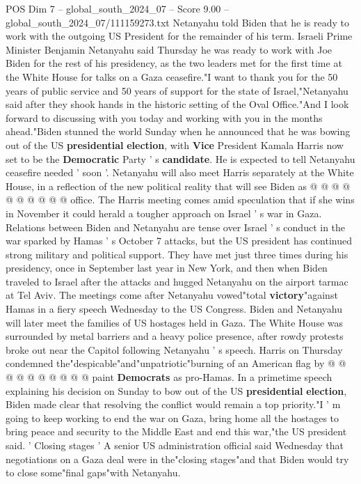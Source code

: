 \begin{textsample}{POS Dim 7 – global\_south\_2024\_07 – Score 9.00 – global\_south\_2024\_07/111159273.txt}  \label{ex:f7_pos_106}
Netanyahu told Biden that he is ready to work with the outgoing US President for the remainder of his term.
Israeli Prime Minister Benjamin Netanyahu said Thursday he was ready to work with Joe Biden for the rest of his presidency, as the two leaders met for the first time at the White House for talks on a Gaza ceasefire."I want to thank you for the 50 years of public service and 50 years of support for the state of Israel,"Netanyahu said after they shook hands in the historic setting of the Oval Office."And I look forward to discussing with you today and working with you in the months ahead."Biden stunned the world Sunday when he announced that he was bowing out of the US \textbf{presidential} \textbf{election}, with \textbf{Vice} President Kamala Harris now set to be the \textbf{Democratic} Party ' s \textbf{candidate}.
He is expected to tell Netanyahu ceasefire needed ' soon '.
Netanyahu will also meet Harris separately at the White House, in a reflection of the new political reality that will see Biden as @ @ @ @ @ @ @ @ @ @ office.
The Harris meeting comes amid speculation that if she wins in November it could herald a tougher approach on Israel ' s war in Gaza.
Relations between Biden and Netanyahu are tense over Israel ' s conduct in the war sparked by Hamas ' s October 7 attacks, but the US president has continued strong military and political support.
They have met just three times during his presidency, once in September last year in New York, and then when Biden traveled to Israel after the attacks and hugged Netanyahu on the airport tarmac at Tel Aviv.
The meetings come after Netanyahu vowed"total \textbf{victory}"against Hamas in a fiery speech Wednesday to the US Congress.
Biden and Netanyahu will later meet the families of US hostages held in Gaza.
The White House was surrounded by metal barriers and a heavy police presence, after rowdy protests broke out near the Capitol following Netanyahu ' s speech.
Harris on Thursday condemned the"despicable"and"unpatriotic"burning of an American flag by @ @ @ @ @ @ @ @ @ @ paint \textbf{Democrats} as pro-Hamas.
In a primetime speech explaining his decision on Sunday to bow out of the US \textbf{presidential} \textbf{election}, Biden made clear that resolving the conflict would remain a top priority."I ' m going to keep working to end the war on Gaza, bring home all the hostages to bring peace and security to the Middle East and end this war,"the US president said. ' Closing stages ' A senior US administration official said Wednesday that negotiations on a Gaza deal were in the"closing stages"and that Biden would try to close some"final gaps"with Netanyahu.

\end{textsample}
